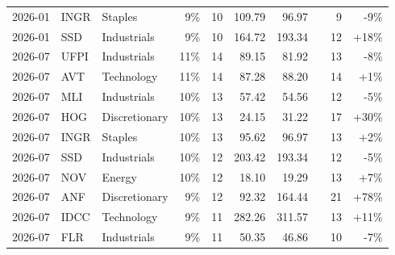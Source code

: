 \documentclass[11pt,a4paper]{article}
\begin{document}
{\begin{longtable}{l l l r r r r r r r}
2026-01 & INGR & Staples & 9\% & 10 & 109.79 & 96.97 &  & 9 & -9\% \\
2026-01 & SSD & Industrials & 9\% & 10 & 164.72 & 193.34 &  & 12 & +18\% \\
2026-07 & UFPI & Industrials & 11\% & 14 & 89.15 & 81.92 &  & 13 & -8\% \\
2026-07 & AVT & Technology & 11\% & 14 & 87.28 & 88.20 &  & 14 & +1\% \\
2026-07 & MLI & Industrials & 10\% & 13 & 57.42 & 54.56 &  & 12 & -5\% \\
2026-07 & HOG & Discretionary & 10\% & 13 & 24.15 & 31.22 &  & 17 & +30\% \\
2026-07 & INGR & Staples & 10\% & 13 & 95.62 & 96.97 &  & 13 & +2\% \\
2026-07 & SSD & Industrials & 10\% & 12 & 203.42 & 193.34 &  & 12 & -5\% \\
2026-07 & NOV & Energy & 10\% & 12 & 18.10 & 19.29 &  & 13 & +7\% \\
2026-07 & ANF & Discretionary & 9\% & 12 & 92.32 & 164.44 &  & 21 & +78\% \\
2026-07 & IDCC & Technology & 9\% & 11 & 282.26 & 311.57 &  & 13 & +11\% \\
2026-07 & FLR & Industrials & 9\% & 11 & 50.35 & 46.86 &  & 10 & -7\% \\
\hline
\end{longtable}}
\end{document}
